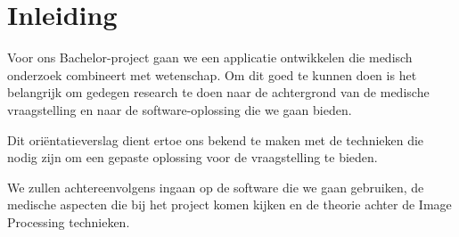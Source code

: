 \section{Inleiding}
\label{inleiding}
Voor ons Bachelor-project gaan we een applicatie ontwikkelen die medisch onderzoek combineert met wetenschap. 
Om dit goed te kunnen doen is het belangrijk om gedegen research te doen naar de achtergrond van de medische vraagstelling en naar de software-oplossing die we gaan bieden.

Dit ori\"{e}ntatieverslag dient ertoe ons bekend te maken met de technieken die nodig zijn om een gepaste oplossing voor de vraagstelling te bieden.

We zullen achtereenvolgens ingaan op de software die we gaan gebruiken, de medische aspecten die bij het project komen kijken en de theorie achter de Image Processing technieken.

